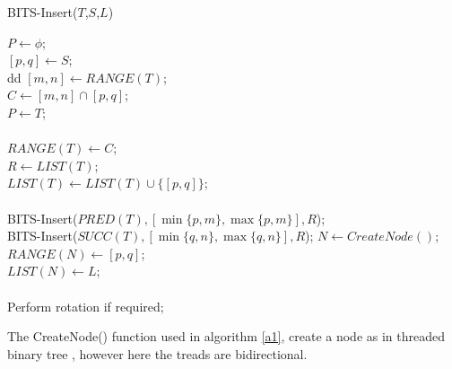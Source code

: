\documentclass{article}
\begin{document}
\begin{algorithm}
\caption{BITS-Insert($T$,$S$,$L$)}\label{a1}
\hspace{-3mm}$P\leftarrow \phi$;\\
$[p,q]\leftarrow S$;\\
{
  {
dd     \hspace{-3mm}$[m,n]\leftarrow RANGE(T)$;\\
     $C\leftarrow [m,n]\cap [p,q]$;\\
     $P\leftarrow T$;\\
     {
        \hspace{-3mm}\\
     } 
  }
  {
    \hspace{-3mm}$RANGE(T) \leftarrow C$;\\
    $R \leftarrow LIST(T)$;\\
    $LIST(T) \leftarrow LIST(T)\cup \{[p,q]\}$;\\
    {
       \hspace{-3mm}\\
       BITS-Insert($PRED(T),[\min \{p,m\},\max \{p,m\}],R$);
    }
    {
       \hspace{-3mm}\\
       BITS-Insert($SUCC(T),[\min \{q,n\},\max \{q,n\}],R$);
    }
  }
}
{
   \hspace{-3mm}$N\leftarrow CreateNode()$;\\
   $RANGE(N)\leftarrow [p,q]$; \\
   $LIST(N) \leftarrow L$;\\
   {
     \hspace{-3mm}\\
   }
   Perform rotation if required;
}
\end{algorithm}
The CreateNode() function used in algorithm \ref{a1}, create a node as in threaded binary tree \cite{k,pt}, however here the treads are bidirectional.
\end{document}
